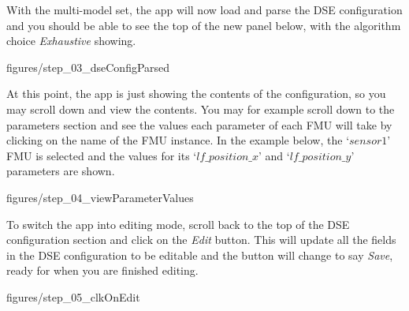 \documentclass[11pt,a4paper]{../tutorial}
\begin{document}
With the multi-model set, the app will now load and parse the DSE configuration and you should be able to see the top of the new panel below, with the algorithm choice \emph{Exhaustive} showing.

\begin{center}\begin{annotation}[width=0.7\linewidth,trim=0 0 0 0,clip]{figures/step_03_dseConfigParsed}
\end{annotation}\end{center}

\newpage

At this point, the app is just showing the contents of the configuration, so you may scroll down and view the contents. You may for example scroll down to the parameters section and see the values each parameter of each FMU will take by clicking on the name of the FMU instance.  In the example below, the `$sensor1$’ FMU is selected and the values for its `$lf\_position\_x$’ and `$lf\_position\_y$’ parameters are shown.


\begin{center}\begin{annotation}[width=0.7\linewidth,trim=0 0 0 0,clip]{figures/step_04_viewParameterValues}
\end{annotation}\end{center}


To switch the app into editing mode, scroll back to the top of the DSE configuration section and click on the \emph{Edit} button. This will update all the fields in the DSE configuration to be editable and the button will change to say \emph{Save}, ready for when you are finished editing.


\begin{center}\begin{annotation}[width=0.7\linewidth,trim=0 0 0 0,clip]{figures/step_05_clkOnEdit}
\end{annotation}\end{center}

\newpage
\end{document}
